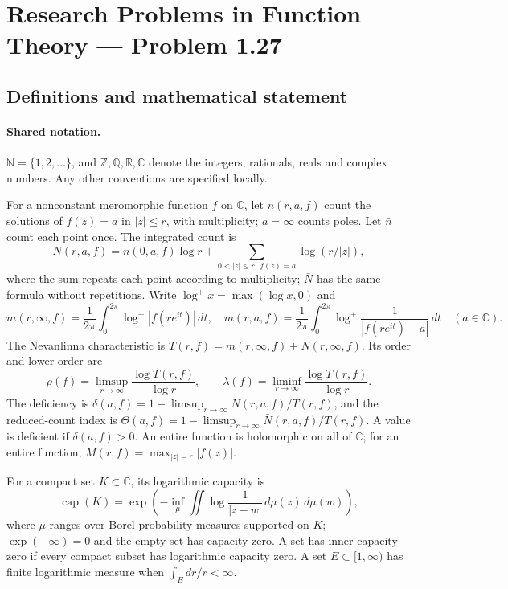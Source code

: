\documentclass[11pt]{article}
\begin{document}
\section{Research Problems in Function Theory — Problem 1.27}\label{statement}

\subsection{Definitions and mathematical statement}

\paragraph{Shared notation.}$\mathbb N=\{1,2,\ldots\}$, and $\mathbb Z,\mathbb Q,\mathbb R,\mathbb C$ denote the integers, rationals, reals and complex numbers. Any other conventions are specified locally.


For a nonconstant meromorphic function $f$ on $\mathbb C$, let $n(r,a,f)$ count the solutions of $f(z)=a$ in $|z|\le r$, with multiplicity; $a=\infty$ counts poles. Let $\bar n$ count each point once. The integrated count is
\[
 N(r,a,f)=n(0,a,f)\log r+\sum_{0<|z|\le r,\ f(z)=a}\log(r/|z|),
\]
where the sum repeats each point according to multiplicity; $\bar N$ has the same formula without repetitions. Write $\log^+x=\max(\log x,0)$ and
\[
 m(r,\infty,f)=\frac1{2\pi}\int_0^{2\pi}\log^+|f(re^{it})|\,dt,\quad
 m(r,a,f)=\frac1{2\pi}\int_0^{2\pi}\log^+\frac1{|f(re^{it})-a|}\,dt\quad(a\in\mathbb C).
\]
The Nevanlinna characteristic is $T(r,f)=m(r,\infty,f)+N(r,\infty,f)$. Its order and lower order are
\[
 \rho(f)=\limsup_{r\to\infty}\frac{\log T(r,f)}{\log r},\qquad
 \lambda(f)=\liminf_{r\to\infty}\frac{\log T(r,f)}{\log r}.
\]
The deficiency is $\delta(a,f)=1-\limsup_{r\to\infty}N(r,a,f)/T(r,f)$, and the reduced-count index is $\Theta(a,f)=1-\limsup_{r\to\infty}\bar N(r,a,f)/T(r,f)$. A value is deficient if $\delta(a,f)>0$. An entire function is holomorphic on all of $\mathbb C$; for an entire function, $M(r,f)=\max_{|z|=r}|f(z)|$.

For a compact set $K\subset\mathbb C$, its logarithmic capacity is
\[
 \operatorname{cap}(K)=\exp\!\left(-\inf_\mu\iint\log\frac1{|z-w|}\,d\mu(z)\,d\mu(w)\right),
\]
where $\mu$ ranges over Borel probability measures supported on $K$; $\exp(-\infty)=0$ and the empty set has capacity zero. A set has inner capacity zero if every compact subset has logarithmic capacity zero. A set $E\subset[1,\infty)$ has finite logarithmic measure when $\int_E dr/r<\infty$.
\end{document}
